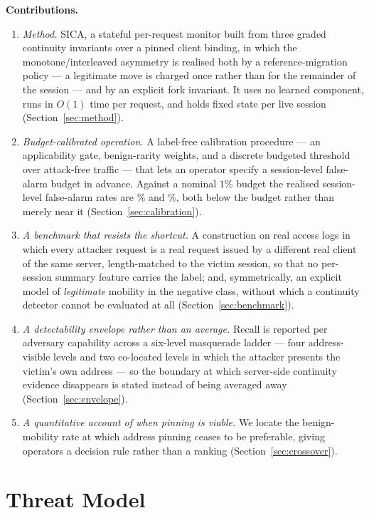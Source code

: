 \documentclass[conference]{IEEEtran}
\begin{document}
\medskip\noindent\textbf{Contributions.}
\begin{enumerate}
\item \emph{Method.}  SICA, a stateful per-request monitor built from three
graded continuity invariants over a pinned client binding, in which the
monotone/interleaved asymmetry is realised both by a reference-migration policy
--- a legitimate move is charged once rather than for the remainder of the
session --- and by an explicit fork invariant.  It uses no learned component,
runs in $O(1)$ time per request, and holds fixed state per live session
(Section~\ref{sec:method}).
\item \emph{Budget-calibrated operation.}  A label-free calibration procedure
--- an applicability gate, benign-rarity weights, and a discrete budgeted
threshold over attack-free traffic --- that lets an operator specify a
session-level false-alarm budget in advance.  Against a nominal $1\%$ budget the
realised session-level false-alarm rates are \fprWeb\% and \fprApt\%, both
below the budget rather than merely near it (Section~\ref{sec:calibration}).
\item \emph{A benchmark that resists the shortcut.}  A construction on real
access logs in which every attacker request is a real request issued by a
different real client of the same server, length-matched to the victim session,
so that no per-session summary feature carries the label; and, symmetrically, an
explicit model of \emph{legitimate} mobility in the negative class, without
which a continuity detector cannot be evaluated at all
(Section~\ref{sec:benchmark}).
\item \emph{A detectability envelope rather than an average.}  Recall is
reported per adversary capability across a six-level masquerade ladder --- four
address-visible levels and two co-located levels in which the attacker presents
the victim's own address --- so the boundary at which server-side continuity
evidence disappears is stated instead of being averaged away
(Section~\ref{sec:envelope}).
\item \emph{A quantitative account of when pinning is viable.}  We locate the
benign-mobility rate at which address pinning ceases to be preferable, giving
operators a decision rule rather than a ranking (Section~\ref{sec:crossover}).
\end{enumerate}

\section{Threat Model}
\label{sec:threat}
\end{document}
